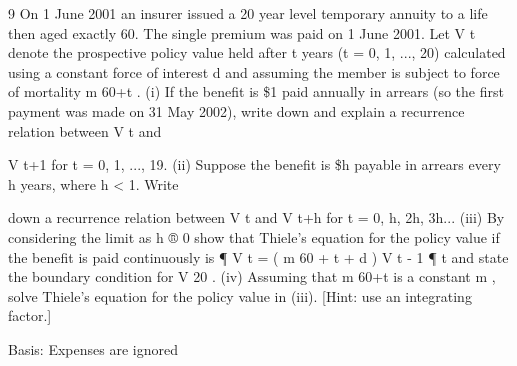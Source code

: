 \documentclass[a4paper,12pt]{article}
\begin{document}
9
On 1 June 2001 an insurer issued a 20 year level temporary annuity to a life then aged
exactly 60. The single premium was paid on 1 June 2001.
Let V t denote the prospective policy value held after t years (t = 0, 1, ..., 20)
calculated using a constant force of interest d and assuming the member is subject to
force of mortality m 60+t .
(i) If the benefit is \$1 paid annually in arrears (so the first payment was made on
31 May 2002), write down and explain a recurrence relation between V t and

V t+1 for t = 0, 1, ..., 19.
(ii) Suppose the benefit is \$h payable in arrears every h years, where h < 1. Write

down a recurrence relation between V t and V t+h for t = 0, h, 2h, 3h...
(iii) By considering the limit as h ® 0 show that Thiele’s equation for the policy
value if the benefit is paid continuously is
¶ V t
= ( m 60 + t + d ) V t - 1
¶ t
and state the boundary condition for V 20 .
(iv)
Assuming that m 60+t is a constant m , solve Thiele’s equation for the policy
value in (iii). [Hint: use an integrating factor.]

Basis: Expenses are ignored
\end{document}
